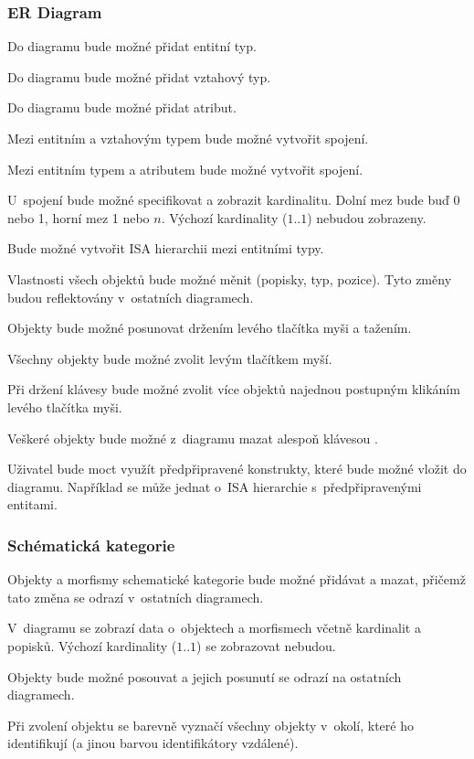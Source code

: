\subsubsection*{ER Diagram}
\begin{enumfp}[resume]
  \item Do diagramu bude možné přidat entitní typ.
  \item Do diagramu bude možné přidat vztahový typ.
  \item Do diagramu bude možné přidat atribut.
  \item Mezi entitním a vztahovým typem bude možné vytvořit spojení.
  \item Mezi entitním typem a atributem bude možné vytvořit spojení.
  \item U~spojení bude možné specifikovat a zobrazit kardinalitu.
  Dolní mez bude buď 0 nebo 1, horní mez 1 nebo $n$.
  Výchozí kardinality ($1..1$) nebudou zobrazeny.
  \item Bude možné vytvořit ISA hierarchii mezi entitními typy.
  \item Vlastnosti všech objektů bude možné měnit (popisky, typ, pozice).
  Tyto změny budou reflektovány v~ostatních diagramech.
  \item Objekty bude možné posunovat držením levého tlačítka myši a tažením.
  \item Všechny objekty bude možné zvolit levým tlačítkem myší.
  \item Při držení klávesy \keys{\ctrl} bude možné zvolit více objektů najednou postupným klikáním levého tlačítka myši.
  \item Veškeré objekty bude možné z~diagramu mazat alespoň klávesou .
  \item Uživatel bude moct využít předpřipravené konstrukty, které bude možné vložit do diagramu.
  Například se může jednat o~ISA hierarchie s~předpřipravenými entitami.
\end{enumfp}

\subsubsection*{Schématická kategorie}
\begin{enumfp}[resume]
  \item Objekty a morfismy schematické kategorie bude možné přidávat a mazat, přičemž tato změna se odrazí v~ostatních diagramech.
  \item V~diagramu se zobrazí data o~objektech a morfismech včetně kardinalit a popisků.
  Výchozí kardinality ($1..1$) se zobrazovat nebudou.
  \item Objekty bude možné posouvat a jejich posunutí se odrazí na ostatních diagramech.
  \item Při zvolení objektu se barevně vyznačí všechny objekty v~okolí, které ho identifikují (a jinou barvou identifikátory vzdálené).
\end{enumfp}

